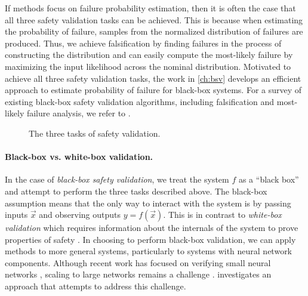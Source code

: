 If methods focus on failure probability estimation, then it is often the case that all three safety validation tasks can be achieved.
This is because when estimating the probability of failure, samples from the normalized distribution of failures are produced.
Thus, we achieve falsification by finding failures in the process of constructing the distribution and can easily compute the most-likely failure by maximizing the input likelihood across the nominal distribution.
Motivated to achieve all three safety validation tasks, the work in \cref{ch:bsv} develops an efficient approach to estimate probability of failure for black-box systems.
For a survey of existing black-box safety validation algorithms, including falsification and most-likely failure analysis, we refer to \textcite{corso2021survey}.


\begin{figure}[t]
    \centering
    \resizebox{\textwidth}{!}{%
        
    }
    \caption{The three tasks of safety validation.}
    \label{fig:safety_validation}
\end{figure}


\paragraph{Black-box vs. white-box validation.}
In the case of \textit{black-box safety validation}, we treat the system $f$ as a ``black box'' and attempt to perform the three tasks described above.
The black-box assumption means that the only way to interact with the system is by passing inputs $\vec{x}$ and observing outputs $y = f(\vec{x})$.
This is in contrast to \textit{white-box validation} which requires information about the internals of the system to prove properties of safety \cite{schumann2001automated,fitting2012firstorder,clarke2018handbook}.
In choosing to perform black-box validation, we can apply methods to more general systems, particularly to systems with neural network components.
Although recent work has focused on verifying small neural networks \cite{katz2017reluplex,liu2021algorithms,sidrane2022overt}, scaling to large networks remains a challenge \cite{konig2024critically}.
 investigates an approach that attempts to address this challenge.
